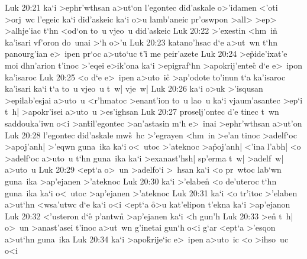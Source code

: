 \vs Luk 20:21
ka`i
>ephr'wthsan
a>ut`on
l'egontec
did'askale
o>'idamen
<'oti
>orj~wc
l'egeic
ka`i
did'askeic
ka`i
o>u
lamb'aneic
pr'oswpon
>all>
>ep>
>alhje'iac
t`hn
<od`on
to~u
vjeo~u
did'askeic\bibvsend
\vs Luk 20:22
>'exestin
<hm~i\r{n}
ka'isari
vf'oron
do~unai
>`h
o>'u\bibvsend
\vs Luk 20:23
katano'hsac
d`e
a>ut~wn
t`hn
panourg'ian
e>~ipen
pr`oc
a>uto`uc
t'i\r{}
me
peir'azete\bibvsend
\vs Luk 20:24
>e\r{p}ide'ixat'e
moi
dhn'arion
t'inoc
>'eqei
e>ik'ona
ka`i
>epigraf`hn
>apokrij'entec\r{}
d`e
e>~ipon
ka'isaroc\bibvsend
\vs Luk 20:25
<o
d`e
e>~ipen
a>uto~ic\r{}
>ap'odote
to'inun
t`a
ka'isaroc
ka'isari
ka`i
t`a
to~u
vjeo~u
t~w|
vje~w|\bibvsend
\vs Luk 20:26
ka`i
o>uk
>'isqusan
>epilab'esjai
a>uto~u
<r'hmatoc
>enant'ion
to~u
lao~u
ka`i
vjaum'asantec
>ep`i
t~h|
>apokr'isei
a>uto~u
>es'ighsan\bibvsend
\vs Luk 20:27
proselj'ontec
d'e
tinec
t~wn
saddouka'iwn
o<i
>an\r{t}il'egontec
>an'astasin
m`h
e>~inai
>ephr'wthsan
a>ut'on\bibvsend
\vs Luk 20:28
l'egontec
did'askale
mw\r{s}~hc
>'egrayen
<hm~in
>e'an
tinoc
>adelf`oc
>apoj'anh|
>'eqwn
guna~ika
ka`i
o<~utoc
>'ateknoc
>a\r{p}oj'anh|
<'ina
l'abh|
<o
>adelf`oc
a>uto~u
t`hn
guna~ika
ka`i
>exanast'hsh|
sp'erma
t~w|
>adelf~w|
a>uto~u\bibvsend
\vs Luk 20:29
<ept`a
o>~un
>adelfo`i
>~hsan
ka`i
<o
pr~wtoc
lab`wn
guna~ika
>ap'ejanen
>'ateknoc\bibvsend
\vs Luk 20:30
ka`i
>'elaben\r{}
<o
de'uteroc
t`hn
guna~ika
ka`i
o<~utoc
>ap'ejanen
>'ateknoc\bibvsend
\vs Luk 20:31
ka`i
<o
tr'itoc
>'elaben
a>ut`hn
<wsa'utwc
d`e
ka`i
o<i
<ept`a
\r{o}>u
kat'elipon
t'ekna
ka`i
>ap'ejanon\bibvsend
\vs Luk 20:32
<'usteron
d`e\r{}
p'antwn\r{}
>ap'ejanen
ka`i
<h
gun'h\bibvsend
\vs Luk 20:33
>en\r{}
t~h|
o>~un
>anast'asei
t'inoc
a>ut~wn
g'inetai
gun`h
o<i
g`ar
<ept`a
>'esqon
a>ut`hn
guna~ika\bibvsend
\vs Luk 20:34
ka`i
>apo\r{k}rije`ic
e>~ipen
a>uto~ic
<o
>ihso~uc
o<i
